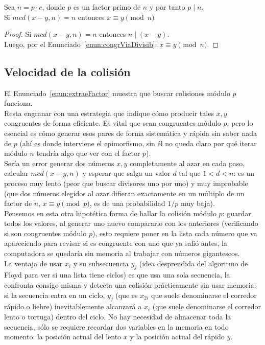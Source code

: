 \begin{enunciado}
\label{enun:Rhomcd2}\leavevmode\par 
Sea $n=p \cdot c$, donde $p$ es un factor primo de $n$ y por tanto $p \mid n$. \\
Si $mcd(x - y, n) = n$ entonces $x \equiv y \pmod n$
\end{enunciado}

\begin{proof} Si $mcd(x - y, n) = n$ entonces $n \mid (x-y)$. \\
Luego, por el Enunciado~\ref{enun:congrViaDivisib}: $x \equiv y \pmod n$.
\end{proof}

\subsection{Velocidad de la colisión}
El Enunciado~\ref{enun:extraeFactor} muestra que buscar colisiones módulo $p$ funciona. \\ 
Resta engranar con una estrategia que indique cómo producir tales $x,y$ congruentes de forma eficiente. 
Es vital que sean congruentes módulo $p$, pero lo esencial es cómo generar esos pares de forma sistemática y rápida sin saber nada de $p$ (ahí es donde interviene el epimorfismo, sin él no queda claro por qué iterar módulo $n$ tendría algo que ver con el factor $p$). \\

Sería un error generar dos números $x,y$ completamente al azar en cada paso, calcular $mcd(x-y,n)$ y esperar que salga un valor $d$ tal que $1<d<n$: es un proceso muy lento (peor que buscar divisores uno por uno) y muy improbable (que dos números elegidos al azar difieran exactamente en un múltiplo de un factor de $n$, $x \equiv y \pmod p$, es de una probabilidad $1/p$ muy baja). \\
Pensemos en esta otra hipotética forma de hallar la colisión módulo $p$: guardar todos los valores, al generar uno nuevo compararlo con los anteriores (verificando si son congruentes módulo $p$), esto requiere poner en la lista cada número que va apareciendo para revisar si es congruente con uno que ya salió antes, la computadora se quedaría sin memoria al trabajar con números gigantescos. \\

La ventaja de usar $x_i$ y su subsecuencia $y_j$ (idea desprendida del algoritmo de Floyd para ver si una lista tiene ciclos) es que usa una sola secuencia, la confronta consigo misma y detecta una colisión prácticamente sin usar memoria: si la secuencia entra en un ciclo, $y_j$ (que es $x_{2i}$ que suele denominarse el corredor rápido o liebre) inevitablemente alcanzará a $x_i$ (que suele denominarse el corredor lento o tortuga) dentro del ciclo. No hay necesidad de almacenar toda la secuencia, sólo se requiere recordar dos variables en la memoria en todo momento: la posición actual del lento $x$ y la posición actual del rápido $y$. \\

